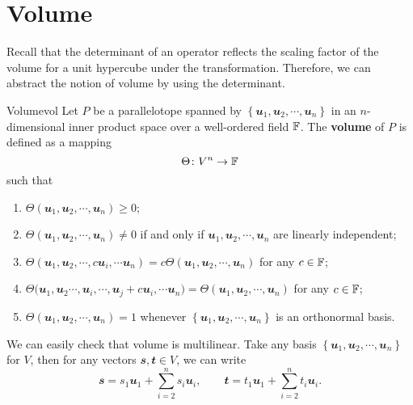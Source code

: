 \documentclass[math, code]{amznotes}
\theoremstyle{remark}
\begin{document}
\section{Volume}
Recall that the determinant of an operator reflects the scaling factor of the volume for a unit hypercube under the transformation. Therefore, we can abstract the notion of volume by using the determinant.
\begin{dfnbox}{Volume}{vol}
    Let $P$ be a parallelotope spanned by $\left\{\mathbfit{u}_1, \mathbfit{u}_2, \cdots, \mathbfit{u}_n\right\}$ in an $n$-dimensional inner product space over a well-ordered field $\mathbb{F}$. The {\color{red} \textbf{volume}} of $P$ is defined as a mapping 
    \begin{equation*}
        \Theta \colon V^n \to \mathbb{F}
    \end{equation*}
    such that 
    \begin{enumerate}
        \item $\Theta\left(\mathbfit{u}_1, \mathbfit{u}_2, \cdots, \mathbfit{u}_n\right) \geq 0$;
        \item $\Theta\left(\mathbfit{u}_1, \mathbfit{u}_2, \cdots, \mathbfit{u}_n\right) \neq 0$ if and only if $\mathbfit{u}_1, \mathbfit{u}_2, \cdots, \mathbfit{u}_n$ are linearly independent;
        \item $\Theta\left(\mathbfit{u}_1, \mathbfit{u}_2, \cdots, c\mathbfit{u}_i, \cdots \mathbfit{u}_n\right) = c\Theta\left(\mathbfit{u}_1, \mathbfit{u}_2, \cdots, \mathbfit{u}_n\right)$ for any $c \in \mathbb{F}$;
        \item $\Theta\bigl(\mathbfit{u}_1, \mathbfit{u}_2 \cdots, \mathbfit{u}_i, \cdots, \mathbfit{u}_j + c\mathbfit{u}_i, \cdots \mathbfit{u}_n\bigr) = \Theta\left(\mathbfit{u}_1, \mathbfit{u}_2, \cdots, \mathbfit{u}_n\right)$ for any $c \in \mathbb{F}$;
        \item $\Theta\left(\mathbfit{u}_1, \mathbfit{u}_2, \cdots, \mathbfit{u}_n\right) = 1$ whenever $\left\{\mathbfit{u}_1, \mathbfit{u}_2, \cdots, \mathbfit{u}_n\right\}$ is an orthonormal basis.
    \end{enumerate}
\end{dfnbox}
We can easily check that volume is multilinear. Take any basis $\left\{\mathbfit{u}_1, \mathbfit{u}_2, \cdots, \mathbfit{u}_n\right\}$ for $V$, then for any vectors $\mathbfit{s}, \mathbfit{t} \in V$, we can write 
\begin{equation*}
    \mathbfit{s} = s_1\mathbfit{u}_1 + \sum_{i = 2}^{n}s_i\mathbfit{u}_i, \qquad \mathbfit{t} = t_1\mathbfit{u}_1 + \sum_{i = 2}^{n}t_i\mathbfit{u}_i.
\end{equation*}
\end{document}

